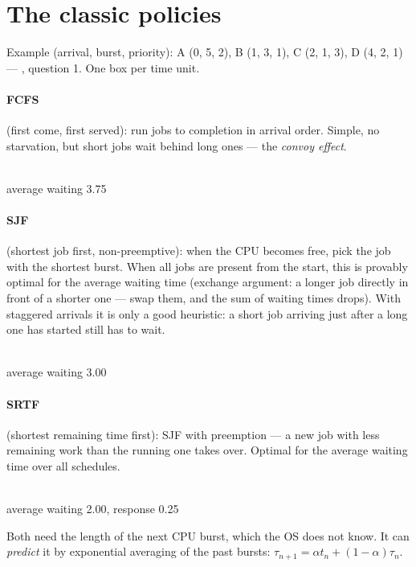 \section{The classic policies}

Example (arrival, burst, priority): A (0, 5, 2), B (1, 3, 1), C (2, 1, 3),
D (4, 2, 1) --- , question 1. One box per time unit.

\paragraph{FCFS} (first come, first served): run jobs to completion in
arrival order. Simple, no starvation, but short jobs wait behind long ones
--- the \emph{convoy effect}.

\begin{center}\\ average waiting 3.75\end{center}

\paragraph{SJF} (shortest job first, non-preemptive): when the CPU becomes
free, pick the job with the shortest burst. When all jobs are present
from the start, this is provably optimal for the average waiting time
(exchange argument: a longer job directly in front of a shorter one ---
swap them, and the sum of waiting times drops). With staggered arrivals
it is only a good heuristic: a short job arriving just after a long one
has started still has to wait.

\begin{center}\\ average waiting 3.00\end{center}

\paragraph{SRTF} (shortest remaining time first): SJF with preemption ---
a new job with less remaining work than the running one takes over.
Optimal for the average waiting time over all schedules.

\begin{center}\\ average waiting 2.00, response 0.25\end{center}

Both need the length of the next CPU burst, which the OS does not know.
It can \emph{predict} it by exponential averaging of the past bursts:
$\tau_{n+1} = \alpha t_n + (1-\alpha)\tau_n$.

